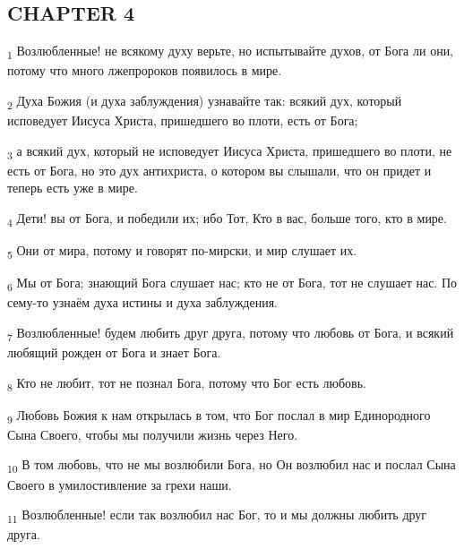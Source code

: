 \subsection{CHAPTER 4}
\begin{tcolorbox}
\textsubscript{1} Возлюбленные! не всякому духу верьте, но испытывайте духов, от Бога ли они, потому что много лжепророков появилось в мире.
\end{tcolorbox}
\begin{tcolorbox}
\textsubscript{2} Духа Божия (и духа заблуждения) узнавайте так: всякий дух, который исповедует Иисуса Христа, пришедшего во плоти, есть от Бога;
\end{tcolorbox}
\begin{tcolorbox}
\textsubscript{3} а всякий дух, который не исповедует Иисуса Христа, пришедшего во плоти, не есть от Бога, но это дух антихриста, о котором вы слышали, что он придет и теперь есть уже в мире.
\end{tcolorbox}
\begin{tcolorbox}
\textsubscript{4} Дети! вы от Бога, и победили их; ибо Тот, Кто в вас, больше того, кто в мире.
\end{tcolorbox}
\begin{tcolorbox}
\textsubscript{5} Они от мира, потому и говорят по-мирски, и мир слушает их.
\end{tcolorbox}
\begin{tcolorbox}
\textsubscript{6} Мы от Бога; знающий Бога слушает нас; кто не от Бога, тот не слушает нас. По сему-то узнаём духа истины и духа заблуждения.
\end{tcolorbox}
\begin{tcolorbox}
\textsubscript{7} Возлюбленные! будем любить друг друга, потому что любовь от Бога, и всякий любящий рожден от Бога и знает Бога.
\end{tcolorbox}
\begin{tcolorbox}
\textsubscript{8} Кто не любит, тот не познал Бога, потому что Бог есть любовь.
\end{tcolorbox}
\begin{tcolorbox}
\textsubscript{9} Любовь Божия к нам открылась в том, что Бог послал в мир Единородного Сына Своего, чтобы мы получили жизнь через Него.
\end{tcolorbox}
\begin{tcolorbox}
\textsubscript{10} В том любовь, что не мы возлюбили Бога, но Он возлюбил нас и послал Сына Своего в умилостивление за грехи наши.
\end{tcolorbox}
\begin{tcolorbox}
\textsubscript{11} Возлюбленные! если так возлюбил нас Бог, то и мы должны любить друг друга.
\end{tcolorbox}
